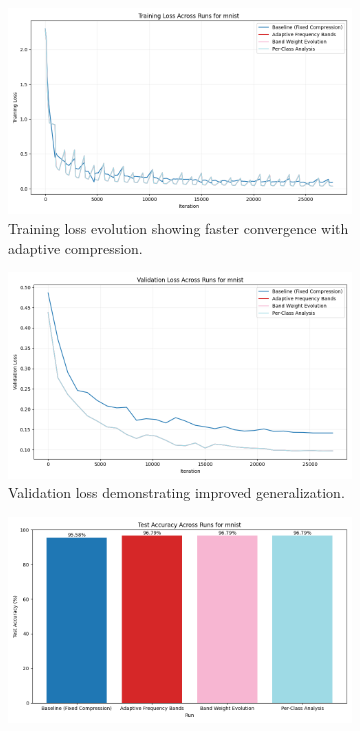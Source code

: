 \documentclass{article} %
\begin{document}
\begin{figure}[h]
    \centering
    \begin{subfigure}{0.32\textwidth}
        \includegraphics[width=\textwidth]{train_loss_mnist_across_runs.png}
        \caption{Training loss evolution showing faster convergence with adaptive compression.}
        \label{fig:train-loss}
    \end{subfigure}
    \hfill
    \begin{subfigure}{0.32\textwidth}
        \includegraphics[width=\textwidth]{val_loss_mnist_across_runs.png}
        \caption{Validation loss demonstrating improved generalization.}
        \label{fig:val-loss}
    \end{subfigure}
    \hfill
    \begin{subfigure}{0.32\textwidth}
        \includegraphics[width=\textwidth]{test_accuracy_mnist_across_runs.png}

\end{subfigure}
\end{figure}
\end{document}
